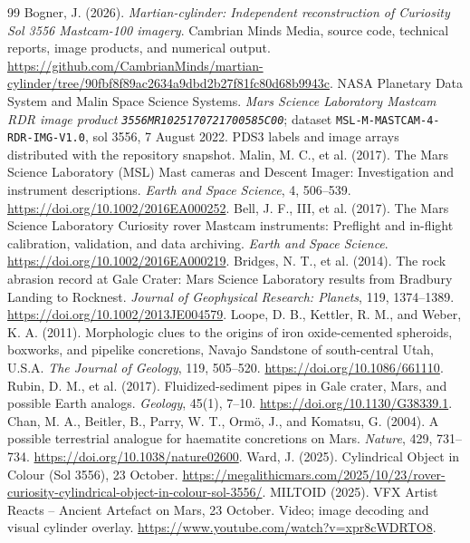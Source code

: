 \documentclass[11pt,letterpaper]{article}
\newcommand{\pdsid}{\texttt{3556MR1025170721700585C00}}
\begin{document}
\begin{thebibliography}{99}\setlength{\itemsep}{4pt}
 Bogner, J. (2026). \emph{Martian-cylinder: Independent reconstruction of Curiosity Sol 3556 Mastcam-100 imagery}. Cambrian Minds Media, source code, technical reports, image products, and numerical output. \url{https://github.com/CambrianMinds/martian-cylinder/tree/90fbf8f89ac2634a9dbd2b27f81fc80d68b9943c}.
 NASA Planetary Data System and Malin Space Science Systems. \emph{Mars Science Laboratory Mastcam RDR image product \pdsid}; dataset \texttt{MSL-M-MASTCAM-4-RDR-IMG-V1.0}, sol 3556, 7 August 2022. PDS3 labels and image arrays distributed with the repository snapshot.
 Malin, M. C., et al. (2017). The Mars Science Laboratory (MSL) Mast cameras and Descent Imager: Investigation and instrument descriptions. \emph{Earth and Space Science}, 4, 506--539. \url{https://doi.org/10.1002/2016EA000252}.
 Bell, J. F., III, et al. (2017). The Mars Science Laboratory Curiosity rover Mastcam instruments: Preflight and in-flight calibration, validation, and data archiving. \emph{Earth and Space Science}. \url{https://doi.org/10.1002/2016EA000219}.
 Bridges, N. T., et al. (2014). The rock abrasion record at Gale Crater: Mars Science Laboratory results from Bradbury Landing to Rocknest. \emph{Journal of Geophysical Research: Planets}, 119, 1374--1389. \url{https://doi.org/10.1002/2013JE004579}.
 Loope, D. B., Kettler, R. M., and Weber, K. A. (2011). Morphologic clues to the origins of iron oxide-cemented spheroids, boxworks, and pipelike concretions, Navajo Sandstone of south-central Utah, U.S.A. \emph{The Journal of Geology}, 119, 505--520. \url{https://doi.org/10.1086/661110}.
 Rubin, D. M., et al. (2017). Fluidized-sediment pipes in Gale crater, Mars, and possible Earth analogs. \emph{Geology}, 45(1), 7--10. \url{https://doi.org/10.1130/G38339.1}.
 Chan, M. A., Beitler, B., Parry, W. T., Orm\"o, J., and Komatsu, G. (2004). A possible terrestrial analogue for haematite concretions on Mars. \emph{Nature}, 429, 731--734. \url{https://doi.org/10.1038/nature02600}.
 Ward, J. (2025). Cylindrical Object in Colour (Sol 3556), 23 October. \url{https://megalithicmars.com/2025/10/23/rover-curiosity-cylindrical-object-in-colour-sol-3556/}.
 MILTOID (2025). VFX Artist Reacts -- Ancient Artefact on Mars, 23 October. Video; image decoding and visual cylinder overlay. \url{https://www.youtube.com/watch?v=xpr8cWDRTO8}.

\end{thebibliography}
\end{document}
